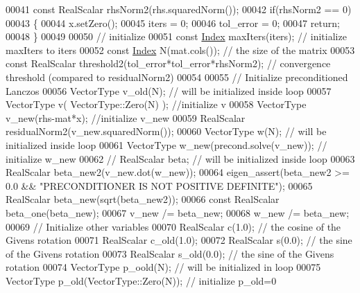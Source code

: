 \begin{DoxyCode}
00041             \textcolor{keyword}{const} RealScalar rhsNorm2(rhs.squaredNorm());
00042             \textcolor{keywordflow}{if}(rhsNorm2 == 0)
00043             \{
00044                 x.setZero();
00045                 iters = 0;
00046                 tol\_error = 0;
00047                 \textcolor{keywordflow}{return};
00048             \}
00049             
00050             \textcolor{comment}{// initialize}
00051             \textcolor{keyword}{const} \hyperlink{namespace_eigen_a62e77e0933482dafde8fe197d9a2cfde}{Index} maxIters(iters);  \textcolor{comment}{// initialize maxIters to iters}
00052             \textcolor{keyword}{const} \hyperlink{namespace_eigen_a62e77e0933482dafde8fe197d9a2cfde}{Index} N(mat.cols());    \textcolor{comment}{// the size of the matrix}
00053             \textcolor{keyword}{const} RealScalar threshold2(tol\_error*tol\_error*rhsNorm2); \textcolor{comment}{// convergence threshold (compared
       to residualNorm2)}
00054             
00055             \textcolor{comment}{// Initialize preconditioned Lanczos}
00056             VectorType v\_old(N); \textcolor{comment}{// will be initialized inside loop}
00057             VectorType v( VectorType::Zero(N) ); \textcolor{comment}{//initialize v}
00058             VectorType v\_new(rhs-mat*x); \textcolor{comment}{//initialize v\_new}
00059             RealScalar residualNorm2(v\_new.squaredNorm());
00060             VectorType w(N); \textcolor{comment}{// will be initialized inside loop}
00061             VectorType w\_new(precond.solve(v\_new)); \textcolor{comment}{// initialize w\_new}
00062 \textcolor{comment}{//            RealScalar beta; // will be initialized inside loop}
00063             RealScalar beta\_new2(v\_new.dot(w\_new));
00064             eigen\_assert(beta\_new2 >= 0.0 && \textcolor{stringliteral}{"PRECONDITIONER IS NOT POSITIVE DEFINITE"});
00065             RealScalar beta\_new(sqrt(beta\_new2));
00066             \textcolor{keyword}{const} RealScalar beta\_one(beta\_new);
00067             v\_new /= beta\_new;
00068             w\_new /= beta\_new;
00069             \textcolor{comment}{// Initialize other variables}
00070             RealScalar c(1.0); \textcolor{comment}{// the cosine of the Givens rotation}
00071             RealScalar c\_old(1.0);
00072             RealScalar s(0.0); \textcolor{comment}{// the sine of the Givens rotation}
00073             RealScalar s\_old(0.0); \textcolor{comment}{// the sine of the Givens rotation}
00074             VectorType p\_oold(N); \textcolor{comment}{// will be initialized in loop}
00075             VectorType p\_old(VectorType::Zero(N)); \textcolor{comment}{// initialize p\_old=0}

\end{DoxyCode}
